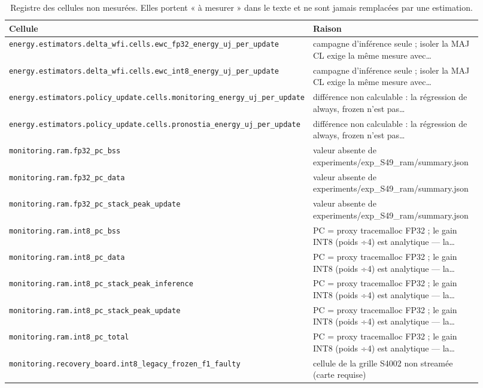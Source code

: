 \begin{table}[htbp]
\centering
\caption{Registre des cellules non mesurées. Elles portent « à mesurer » dans le texte et ne sont jamais remplacées par une estimation.}
\label{tab:annex-missing}
\begin{tabular}{p{0.42\linewidth}p{0.5\linewidth}}
\toprule
Cellule & Raison \\
\midrule
\texttt{energy.estimators.delta\_wfi.cells.ewc\_fp32\_energy\_uj\_per\_update} & campagne d'inférence seule ; isoler la MAJ CL exige la même mesure avec… \\
\texttt{energy.estimators.delta\_wfi.cells.ewc\_int8\_energy\_uj\_per\_update} & campagne d'inférence seule ; isoler la MAJ CL exige la même mesure avec… \\
\texttt{energy.estimators.policy\_update.cells.monitoring\_energy\_uj\_per\_update} & différence non calculable : la régression de always, frozen n'est pas… \\
\texttt{energy.estimators.policy\_update.cells.pronostia\_energy\_uj\_per\_update} & différence non calculable : la régression de always, frozen n'est pas… \\
\texttt{monitoring.ram.fp32\_pc\_bss} & valeur absente de experiments/exp\_S49\_ram/summary.json \\
\texttt{monitoring.ram.fp32\_pc\_data} & valeur absente de experiments/exp\_S49\_ram/summary.json \\
\texttt{monitoring.ram.fp32\_pc\_stack\_peak\_update} & valeur absente de experiments/exp\_S49\_ram/summary.json \\
\texttt{monitoring.ram.int8\_pc\_bss} & PC = proxy tracemalloc FP32 ; le gain INT8 (poids ÷4) est analytique — la… \\
\texttt{monitoring.ram.int8\_pc\_data} & PC = proxy tracemalloc FP32 ; le gain INT8 (poids ÷4) est analytique — la… \\
\texttt{monitoring.ram.int8\_pc\_stack\_peak\_inference} & PC = proxy tracemalloc FP32 ; le gain INT8 (poids ÷4) est analytique — la… \\
\texttt{monitoring.ram.int8\_pc\_stack\_peak\_update} & PC = proxy tracemalloc FP32 ; le gain INT8 (poids ÷4) est analytique — la… \\
\texttt{monitoring.ram.int8\_pc\_total} & PC = proxy tracemalloc FP32 ; le gain INT8 (poids ÷4) est analytique — la… \\
\texttt{monitoring.recovery\_board.int8\_legacy\_frozen\_f1\_faulty} & cellule de la grille S4002 non streamée (carte requise) \\

\end{tabular}
\end{table}
